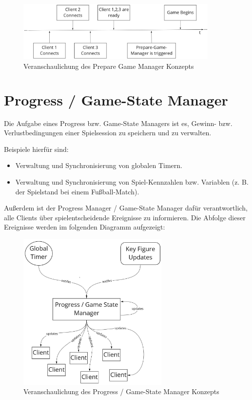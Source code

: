 \begin{figure}[H]
	\centering
	\includegraphics[width=100mm]{images/prepare_game_manager.jpg}
	\caption[Prepare-Game-Manager]{Veranschaulichung des Prepare Game Manager Konzepts}
	\label{pic:prepare_game_manager}
\end{figure}

\section{Progress / Game-State Manager}
\label{progress_manager}

Die Aufgabe eines Progress bzw. Game-State Managers ist es, Gewinn- bzw. Verlustbedingungen einer Spielsession zu speichern und zu verwalten. 

Beispiele hierfür sind: \\
\begin{itemize}
	\item Verwaltung und Synchronisierung von globalen Timern.
	\item Verwaltung und Synchronisierung von Spiel-Kennzahlen bzw. Variablen (z. B. der Spielstand bei einem Fußball-Match).
\end{itemize}

Außerdem ist der Progress Manager / Game-State Manager dafür verantwortlich, alle Clients über spielentscheidende Ereignisse zu informieren. Die Abfolge dieser Ereignisse werden im folgenden Diagramm aufgezeigt:

\begin{figure}[H]
	\centering
	\includegraphics[width=75mm]{images/Progress_State_Manager.jpg}
	\caption[Progress / Game-State Manager]{Veranschaulichung des Progress / Game-State Manager Konzepts}
	\label{pic:Progress_State_Manager}
\end{figure}

